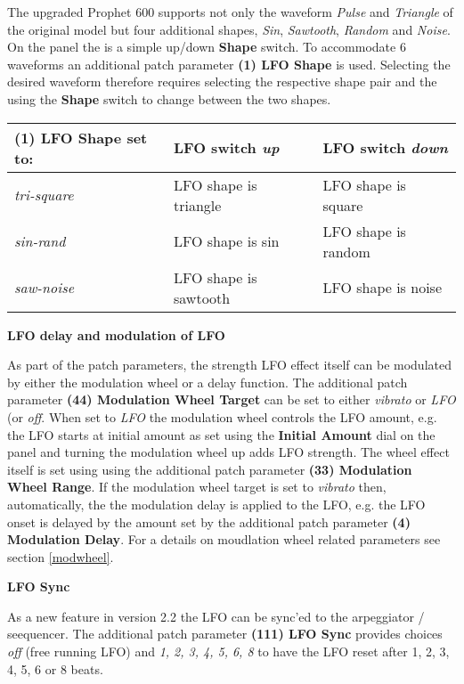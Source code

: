 The upgraded Prophet 600 supports not only the waveform \textit{Pulse} and \textit{Triangle} of the original model but four additional shapes, \textit{Sin}, \textit{Sawtooth}, \textit{Random} and \textit{Noise}. On the panel the is a simple up/down \textbf{Shape} switch. To accommodate 6 waveforms an additional patch parameter \textbf{(1) LFO Shape} is used. Selecting the desired waveform therefore requires selecting the respective shape pair and the using the \textbf{Shape} switch to change between the two shapes. 

\begin{tabular}{ |l|l|l|} 
 \hline
  \textbf{(1) LFO Shape} set to: & \textbf{LFO} switch \textit{up} & \textbf{LFO} switch \textit{down} \\
 \hline
 \textit{tri-square} & LFO shape is triangle & LFO shape is square\\
 \hline
 \textit{sin-rand} & LFO shape is sin & LFO shape is random \\
 \hline
 \textit{saw-noise} & LFO shape is sawtooth & LFO shape is noise \\
 \hline
\end{tabular}

\textbf{LFO delay and modulation of LFO}

As part of the patch parameters, the strength LFO effect itself can be modulated by either the modulation wheel or a delay function. The additional patch parameter \textbf{(44) Modulation Wheel Target} can be set to either \textit{vibrato} or \textit{LFO} (or \textit{off}. When set to \textit{LFO} the modulation wheel controls the LFO amount, e.g. the LFO starts at initial amount as set using the \textbf{Initial Amount} dial on the panel and turning the modulation wheel up adds LFO strength. The wheel effect itself is set using using the additional patch parameter \textbf{(33) Modulation Wheel Range}. If the modulation wheel target is set to \textit{vibrato} then, automatically, the the modulation delay is applied to the LFO, e.g. the LFO onset is delayed by the amount set by the additional patch parameter \textbf{(4) Modulation Delay}. For a details on moudlation wheel related parameters see section \ref{modwheel}.

\textbf{LFO Sync}

As a new feature in version 2.2 the LFO can be sync'ed to the arpeggiator / seequencer. The additional patch parameter \textbf{(111) LFO Sync} provides choices \textit{off} (free running LFO) and \textit{1, 2, 3, 4, 5, 6, 8} to have the LFO reset after 1, 2, 3, 4, 5, 6 or 8 beats. 
